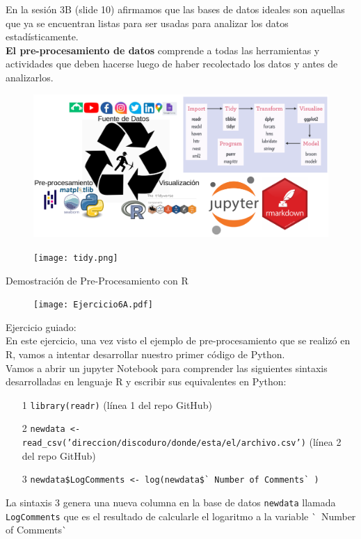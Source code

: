 \documentclass[aspectratio=169]{beamer}
\begin{document}
\begin{frame}
En la sesión 3B (slide 10) afirmamos que las bases de datos ideales son aquellas que ya se encuentran listas para ser usadas para analizar los datos estadísticamente.\\
\vspace{0.5cm}
\textbf{El pre-procesamiento de datos} comprende a todas las herramientas y actividades que deben hacerse luego de haber recolectado los datos y antes de analizarlos. 
\begin{figure}
\centering
\includegraphics[width=.5\textwidth]{tools.png}
\end{figure}
\end{frame}

\begin{frame}
\begin{figure}
\centering
\texttt{[image: tidy.png]}
\end{figure}
\end{frame}

\begin{frame}
Demostración de Pre-Procesamiento con R
\begin{figure}
\centering
\texttt{[image: Ejercicio6A.pdf]}
\end{figure}
\end{frame}

\begin{frame}
Ejercicio guiado:\\
\vspace{0.3cm}
En este ejercicio, una vez visto el ejemplo de pre-procesamiento que se realizó en R, vamos a intentar desarrollar nuestro primer código de Python. \\
\vspace{0.3cm}
Vamos a abrir un jupyter Notebook para comprender las siguientes  sintaxis desarrolladas en lenguaje R y escribir sus equivalentes en Python:\\
\begin{itemize}
\item[1] \texttt{library(readr)}  (línea 1 del repo GitHub)
\item[2] \texttt{newdata <- read\_csv('direccion/discoduro/donde/esta/el/archivo.csv')} (línea 2 del repo GitHub)
\item[3] \texttt{newdata\$LogComments <- log(newdata\$\`~Number of Comments\`~)}
\end{itemize}
\vspace{0.3cm}
La sintaxis 3 genera una nueva columna en la base de datos \texttt{newdata} llamada \texttt{LogComments} que es el resultado de calcularle el logaritmo a la variable  \`~Number of Comments\`~
\end{frame}
\end{document}
